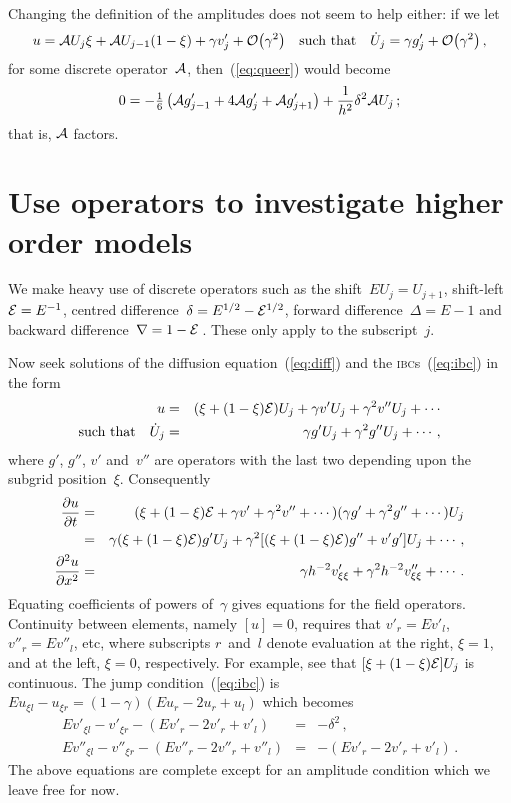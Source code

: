 \documentclass[a5paper]{article}
\newcommand{\ibc}{\textsc{ibc}}
\newcommand{\cA}{{\cal A}}
\newcommand{\cE}{{\cal E}}
\newcommand{\uzero}{\xi+(1-\xi)\cE}
\begin{document}
Changing the definition of the amplitudes does not seem to help 
either:  if we let
\begin{equation}
	u=\cA U_j\xi+\cA U_{j-1}(1-\xi)+\gamma v'_j+\Ord{\gamma^2}
	\quad\mbox{such that}\quad
	\dot U_j=\gamma g'_j+\Ord{\gamma^2}\,,
	\label{eq:linearm}
\end{equation}
for some discrete operator~$\cA$, then~(\ref{eq:queer}) would become
\begin{equation}
	0= -\rat16\left(\cA g'_{j-1}+4\cA g'_j+\cA g'_{j+1}\right)
	+\frac{1}{h^2}\delta^2\cA U_j\,;
	\label{eq:queerm}
\end{equation}
that is, $\cA$ factors.


\section{Use operators to investigate higher order models}

We make heavy use of discrete operators such as the shift~$E 
U_j=U_{j+1}$, shift-left~$\cE=E^{-1}$, centred 
difference~$\delta=E^{1/2}-\cE^{1/2}$, forward difference~$\Delta=E-1$ 
and backward difference~$\nabla=1-\cE$\,.  These only apply to the 
subscript~$j$.

Now seek solutions of the diffusion equation~(\ref{eq:diff}) and the 
\ibc{}s~(\ref{eq:ibc}) in the form
\begin{eqnarray}
	u & = & (\uzero) U_j +\gamma v'U_j +\gamma^2v''U_j +\cdots
	\label{eq:opu}  \\
	\mbox{such that}\quad
	\dot U_j & = & \gamma g'U_j +\gamma^2g''U_j +\cdots\,,
	\label{eq:opg}
\end{eqnarray}
where $g'$, $g''$, $v'$ and~$v''$ are operators with the last two 
depending upon the subgrid position~$\xi$.  Consequently
\begin{eqnarray}
	\D tu & = & (\uzero +\gamma v' +\gamma^2v''
	+\cdots)(\gamma g' +\gamma^2g'' +\cdots)U_j  \nonumber\\
	 & = & \gamma(\uzero)g'U_j +\gamma^2 [(\uzero)g'' +v'g']U_j 
	 +\cdots\,, \label{eq:ut}\\
	\DD xu & = & \gamma h^{-2}v'_{\xi\xi} +\gamma^2h^{-2}v''_{\xi\xi} 
	+\cdots\,. \label{eq:uxx}
\end{eqnarray}
Equating coefficients of powers of~$\gamma$ gives equations for the 
field operators.
Continuity between elements, namely $[u]=0$, requires that 
$v'_r=Ev'_l$, $v''_r=Ev''_l$, etc, where subscripts $r$~and~$l$ denote 
evaluation at the right, $\xi=1$, and at the left, $\xi=0$, 
respectively.
For example, see that $[\uzero]U_j$ is continuous.
The jump condition~(\ref{eq:ibc}) is $Eu_{\xi l} -u_{\xi r} 
=(1-\gamma) (Eu_r-2u_r+u_l)$ which becomes
\begin{eqnarray}
Ev'_{\xi l} -v'_{\xi r}-(Ev'_r-2v'_r+v'_l) & = & -\delta^2\,,
	\label{eq:vdjmp}  \\
Ev''_{\xi l} -v''_{\xi r}-(Ev''_r-2v''_r+v''_l) & = & 
-(Ev'_r-2v'_r+v'_l)\,.
	\label{eq:vddjmp}
\end{eqnarray}
The above equations are complete except for an amplitude condition 
which we leave free for now.
\end{document}
